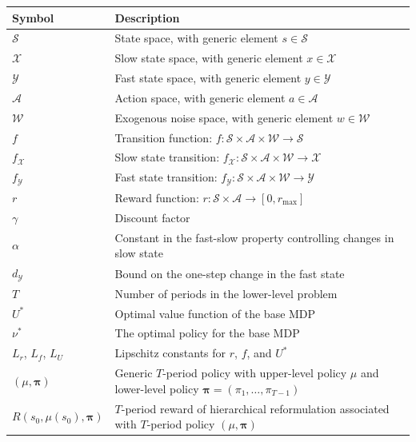 \documentclass[11pt, notitlepage]{article}
\newcommand{\1}{\mathbbm{1}}
\begin{document}
\begin{table}[hb!]
\centering
{\footnotesize
\vspace{10pt}
\begin{tabular}{@{}ll@{}}
\toprule
\textbf{Symbol} & \textbf{Description} \\ \midrule
$\mathcal{S}$ & State space, with generic element $s \in \mathcal S$ \\[0.5em]
$\mathcal{X}$ & Slow state space, with generic element $x \in \mathcal X$ \\[0.5em]
$\mathcal{Y}$ & Fast state space, with generic element $y \in \mathcal Y$ \\[0.5em]
$\mathcal{A}$ & Action space, with generic element $a \in \mathcal A$ \\[0.5em]
$\mathcal{W}$ & Exogenous noise space, with generic element $w \in \mathcal W$ \\[0.5em]
$f$ & Transition function: $f:\mathcal{S}\times\mathcal{A}\times\mathcal{W}\to\mathcal{S}$ \\[0.5em]
$f_\mathcal{X}$ & Slow state transition: $f_\mathcal{X}:\mathcal{S}\times\mathcal{A}\times\mathcal{W}\to\mathcal{X}$ \\[0.5em]
$f_\mathcal{Y}$ & Fast state transition: $f_\mathcal{Y}:\mathcal{S}\times\mathcal{A}\times\mathcal{W}\to\mathcal{Y}$ \\[0.5em]
$r$ & Reward function: $r:\mathcal{S}\times\mathcal{A}\to [0, r_{\max}]$ \\[0.5em]
$\gamma$ & Discount factor \\[0.5em]
$\alpha$ & Constant in the fast-slow property controlling changes in slow state \\[0.5em]
$d_\mathcal{Y}$ & Bound on the one-step change in the fast state \\[0.5em]
$T$ & Number of periods in the lower-level problem \\[0.5em]
$U^*$ & Optimal value function of the base MDP \\[0.5em]
$\nu^*$ & The optimal policy for the base MDP \\ [0.5em]
$L_r$, $L_f$, $L_U$ & Lipschitz constants for $r$, $f$, and $U^*$ \\ [0.5em]
$(\mu, \boldsymbol{\pi})$ & Generic $T$-period policy with upper-level policy $\mu$ and lower-level policy $\boldsymbol{\pi} = (\pi_1,\dots,\pi_{T-1})$ \\[0.5em]
$R(s_0, \mu(s_0), \boldsymbol{\pi})$ & $T$-period reward of hierarchical reformulation associated with $T$-period policy $(\mu, \boldsymbol{\pi})$\\[0.5em]

\end{tabular}}
\end{table}
\end{document}
